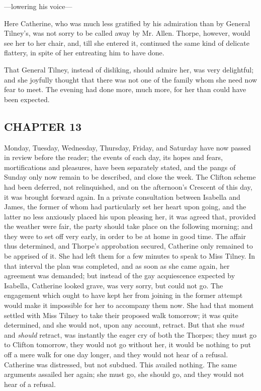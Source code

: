 
---lowering his voice---

Here Catherine, who was much less gratified by his admiration than by General Tilney's, was not sorry to be called away by Mr. Allen. Thorpe, however, would see her to her chair, and, till she entered it, continued the same kind of delicate flattery, in spite of her entreating him to have done.

That General Tilney, instead of disliking, should admire her, was very delightful; and she joyfully thought that there was not one of the family whom she need now fear to meet. The evening had done more, much more, for her than could have been expected.

\subsection[chapter-13]{\useURL[url15][][][]\from[url15]CHAPTER 13}

Monday, Tuesday, Wednesday, Thursday, Friday, and Saturday have now passed in review before the reader; the events of each day, its hopes and fears, mortifications and pleasures, have been separately stated, and the pangs of Sunday only now remain to be described, and close the week. The Clifton scheme had been deferred, not relinquished, and on the afternoon's Crescent of this day, it was brought forward again. In a private consultation between Isabella and James, the former of whom had particularly set her heart upon going, and the latter no less anxiously placed his upon pleasing her, it was agreed that, provided the weather were fair, the party should take place on the following morning; and they were to set off very early, in order to be at home in good time. The affair thus determined, and Thorpe's approbation secured, Catherine only remained to be apprised of it. She had left them for a few minutes to speak to Miss Tilney. In that interval the plan was completed, and as soon as she came again, her agreement was demanded; but instead of the gay acquiescence expected by Isabella, Catherine looked grave, was very sorry, but could not go. The engagement which ought to have kept her from joining in the former attempt would make it impossible for her to accompany them now. She had that moment settled with Miss Tilney to take their proposed walk tomorrow; it was quite determined, and she would not, upon any account, retract. But that she {\em must} and {\em should} retract, was instantly the eager cry of both the Thorpes; they must go to Clifton tomorrow, they would not go without her, it would be nothing to put off a mere walk for one day longer, and they would not hear of a refusal. Catherine was distressed, but not subdued.  This availed nothing. The same arguments assailed her again; she must go, she should go, and they would not hear of a refusal. 

